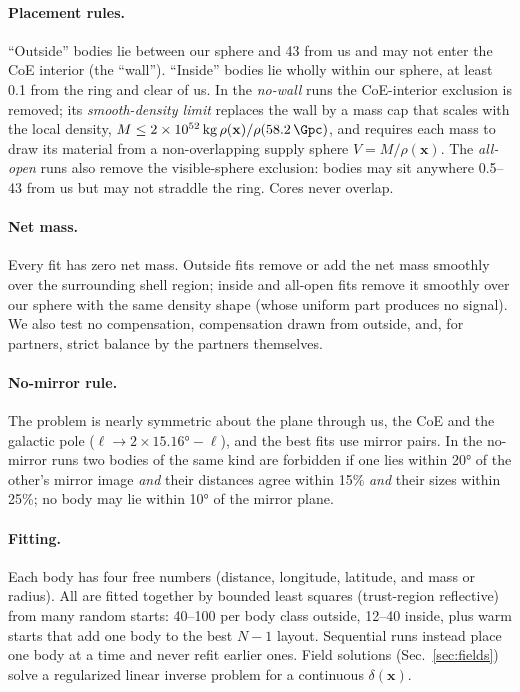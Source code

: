 \documentclass[aps,prd,twocolumn,nofootinbib,superscriptaddress,floatfix]{revtex4-2}
\begin{document}
\paragraph*{Placement rules.} ``Outside'' bodies lie between our sphere and \SI{43}{\Gpc} from us and may not enter the CoE interior (the ``wall''). ``Inside'' bodies lie wholly within our sphere, at least \SI{0.1}{\Gpc} from the ring and clear of us. In the \emph{no-wall} runs the CoE-interior exclusion is removed; its \emph{smooth-density limit} replaces the wall by a mass cap that scales with the local density, $M\le\SI{2e52}{\kilo\gram}\,\rho(\mathbf{x})/\rho(\SI{58.2}{\Gpc})$, and requires each mass to draw its material from a non-overlapping supply sphere $V=M/\rho(\mathbf{x})$. The \emph{all-open} runs also remove the visible-sphere exclusion: bodies may sit anywhere \SIrange{0.5}{43}{\Gpc} from us but may not straddle the ring. Cores never overlap.

\paragraph*{Net mass.} Every fit has zero net mass. Outside fits remove or add the net mass smoothly over the surrounding shell region; inside and all-open fits remove it smoothly over our sphere with the same density shape (whose uniform part produces no signal). We also test no compensation, compensation drawn from outside, and, for partners, strict balance by the partners themselves.

\paragraph*{No-mirror rule.} The problem is nearly symmetric about the plane through us, the CoE and the galactic pole ($\ell\to2\times\ang{15.16}-\ell$), and the best fits use mirror pairs. In the no-mirror runs two bodies of the same kind are forbidden if one lies within \ang{20} of the other's mirror image \emph{and} their distances agree within 15\% \emph{and} their sizes within 25\%; no body may lie within \ang{10} of the mirror plane.

\paragraph*{Fitting.} Each body has four free numbers (distance, longitude, latitude, and mass or radius). All are fitted together by bounded least squares (trust-region reflective) from many random starts: 40--100 per body class outside, 12--40 inside, plus warm starts that add one body to the best $N-1$ layout. Sequential runs instead place one body at a time and never refit earlier ones. Field solutions (Sec.~\ref{sec:fields}) solve a regularized linear inverse problem for a continuous $\delta(\mathbf{x})$.
\end{document}

